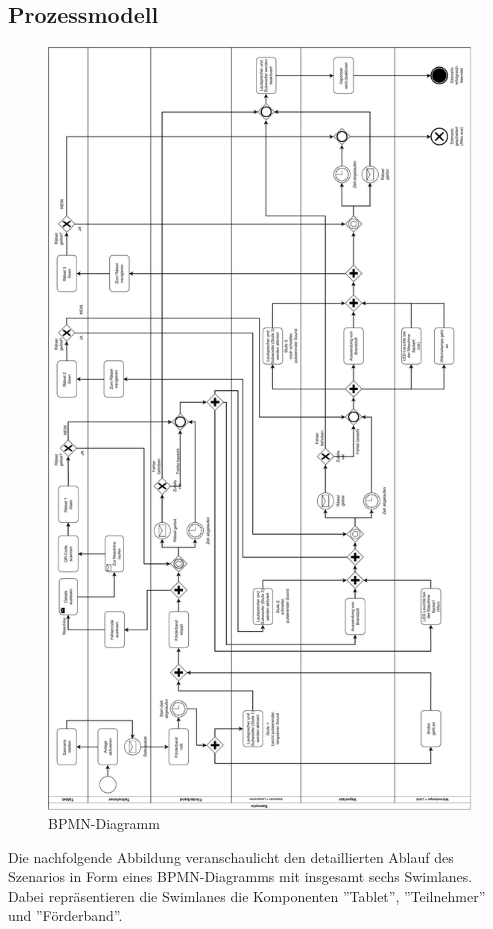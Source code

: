 \subsection{Prozessmodell}
\label{chap:process model} 
\begin{figure}
    \includegraphics[scale=0.37]{res/Finales Szenario BPMN(korrigiert).drawio-5.pdf}
    \caption{BPMN-Diagramm}
\end{figure}

Die nachfolgende Abbildung veranschaulicht den detaillierten Ablauf des Szenarios in Form eines BPMN-Diagramms mit insgesamt sechs Swimlanes. Dabei repräsentieren die Swimlanes die Komponenten ''Tablet'', ''Teilnehmer'' und ''Förderband''.

